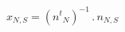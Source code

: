\documentclass[border=2pt]{standalone}
\begin{document}
${x}{_{N, S}}=\left( {{n^t}}{_{N}} \right)^{-1} \, . \, {n}{_{N, S}}$
\end{document}
